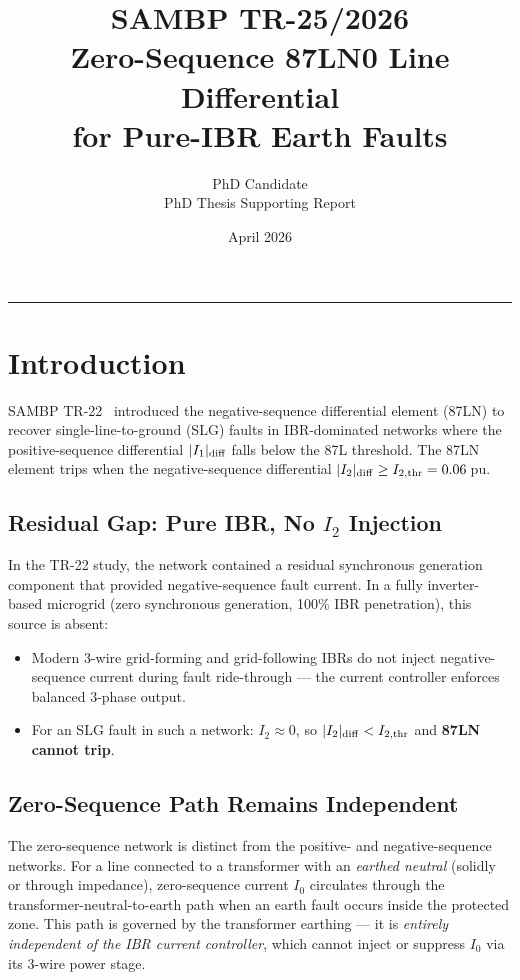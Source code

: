 \documentclass[11pt,a4paper]{article}
\title{%
  \textbf{SAMBP TR-25/2026}\\[4pt]
  Zero-Sequence 87LN0 Line Differential\\
  for Pure-IBR Earth Faults}
\author{PhD Candidate\\PhD Thesis Supporting Report}
\date{April 2026}
\begin{document}
\maketitle
\tableofcontents
\vspace{6pt}\hrule\vspace{10pt}

\section{Introduction}

SAMBP TR-22~\cite{SAMBP_TR22} introduced the negative-sequence differential
element (87LN) to recover single-line-to-ground (SLG) faults in IBR-dominated
networks where the positive-sequence differential $|I_1|_{\rm diff}$ falls
below the 87L threshold.  The 87LN element trips when the negative-sequence
differential $|I_2|_{\rm diff} \geq I_{2,\rm thr} = 0.06$\,pu.

\subsection{Residual Gap: Pure IBR, No $I_2$ Injection}

In the TR-22 study, the network contained a residual synchronous generation
component that provided negative-sequence fault current.  In a fully
inverter-based microgrid (zero synchronous generation, 100\% IBR penetration),
this source is absent:
\begin{itemize}
  \item Modern 3-wire grid-forming and grid-following IBRs do not inject
    negative-sequence current during fault ride-through — the current
    controller enforces balanced 3-phase output.
  \item For an SLG fault in such a network: $I_2 \approx 0$, so
    $|I_2|_{\rm diff} < I_{2,\rm thr}$ and \textbf{87LN cannot trip}.
\end{itemize}

\subsection{Zero-Sequence Path Remains Independent}

The zero-sequence network is distinct from the positive- and negative-sequence
networks.  For a line connected to a transformer with an \emph{earthed neutral}
(solidly or through impedance), zero-sequence current $I_0$ circulates through
the transformer-neutral-to-earth path when an earth fault occurs inside the
protected zone.  This path is governed by the transformer earthing — it is
\emph{entirely independent of the IBR current controller}, which cannot inject
or suppress $I_0$ via its 3-wire power stage.
\end{document}
